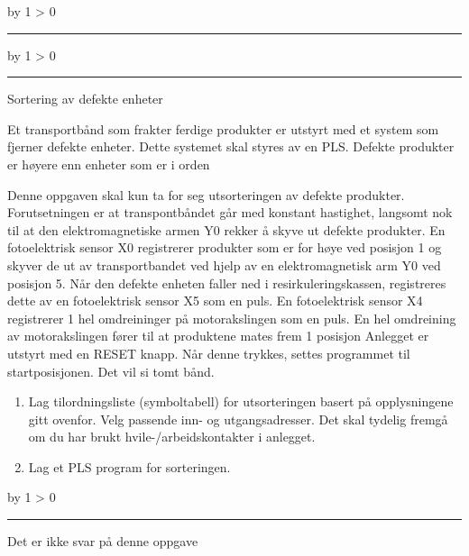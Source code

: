 \documentclass[12pt,a4paper]{article}
\def\oppgave{
            \advance\questnum by 1
            \ifnum \questnum > 0
                 \hrule
                 \vskip 3pt
                 \leftline{Oppgave \the\questnum}
                 \vskip 3pt \fi}
\def\svar{
           \advance\answnum by 1
           \ifnum \answnum > 0
                \hrule
                \vskip 3pt
                \leftline{Svar \the\answnum}
                \vskip 3pt \fi}
\def\notes{
           \advance\explnum by 1
           \ifnum \explnum > 0
                \hrule
                \vskip 3pt
                \leftline{Notes \the\explnum}
                \vskip 3pt \fi}
\begin{document}
\notes{} 



\vfil \eject 





\oppgave{} 

Sortering av defekte enheter 

Et transportbånd som frakter ferdige produkter er utstyrt med et system
som fjerner defekte enheter. Dette systemet skal styres av en PLS.
Defekte produkter er høyere enn enheter som er i orden


Denne oppgaven skal kun ta for seg utsorteringen av defekte produkter.
Forutsetningen er at transpontbåndet går med konstant hastighet, langsomt
nok til at den elektromagnetiske armen Y0 rekker å skyve ut defekte
produkter. En fotoelektrisk sensor X0 registrerer produkter som er
for høye ved posisjon 1 og skyver de ut av transportbandet ved hjelp
av en elektromagnetisk arm Y0 ved posisjon 5. Når den defekte enheten
faller ned i resirkuleringskassen, registreres dette av en fotoelektrisk
sensor X5 som en puls. En fotoelektrisk sensor X4 registrerer 1 hel
omdreininger på motorakslingen som en puls. En hel omdreining av motorakslingen
fører til at produktene mates frem 1 posisjon Anlegget er utstyrt
med en RESET knapp. Når denne trykkes, settes programmet til startposisjonen.
Det vil si tomt bånd. 
\begin{enumerate}
\item Lag tilordningsliste (symboltabell) for utsorteringen basert på opplysningene
gitt ovenfor. Velg passende inn- og utgangsadresser. Det skal tydelig
fremgå om du har brukt hvile-/arbeidskontakter i anlegget.
\item Lag et PLS program for sorteringen. 
\end{enumerate}

\vskip 10pt

\vskip 10pt \filbreak 





\svar{} 
Det er ikke svar på denne oppgave
\vskip 10pt \filbreak 
\end{document}
